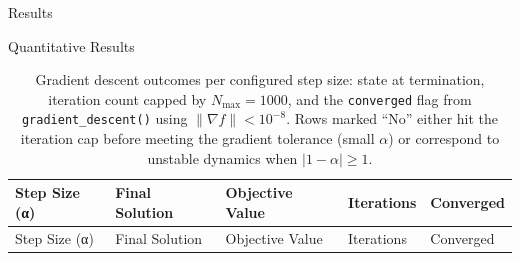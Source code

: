 \documentclass[
  ignorenonframetext,
]{beamer}
\begin{document}
\begin{frame}[fragile]{Results}
\begin{block}{Quantitative Results}
\begin{longtable}[]{@{}
  >{\raggedright\arraybackslash}p{}
  >{\raggedright\arraybackslash}p{}
  >{\raggedright\arraybackslash}p{}
  >{\raggedright\arraybackslash}p{}
  >{\raggedright\arraybackslash}p{}@{}}
\caption{Gradient descent outcomes per configured step size: state at
termination, iteration count capped by \(N_{\max} = 1000\), and the
\protect\texttt{converged} flag from
\protect\texttt{gradient\_descent()} using \(\|\nabla f\| < 10^{-8}\).
Rows marked ``No'' either hit the iteration cap before meeting the
gradient tolerance (small \(\alpha\)) or correspond to unstable dynamics
when \(|1-\alpha| \geq 1\). \label{tab:opt_results}}\tabularnewline
\toprule\noalign{}
\begin{minipage}[b]{\linewidth}\raggedright
Step Size (α)
\end{minipage} & \begin{minipage}[b]{\linewidth}\raggedright
Final Solution
\end{minipage} & \begin{minipage}[b]{\linewidth}\raggedright
Objective Value
\end{minipage} & \begin{minipage}[b]{\linewidth}\raggedright
Iterations
\end{minipage} & \begin{minipage}[b]{\linewidth}\raggedright
Converged
\end{minipage} \\
\midrule\noalign{}
\endfirsthead
\toprule\noalign{}
\begin{minipage}[b]{\linewidth}\raggedright
Step Size (α)
\end{minipage} & \begin{minipage}[b]{\linewidth}\raggedright
Final Solution
\end{minipage} & \begin{minipage}[b]{\linewidth}\raggedright
Objective Value
\end{minipage} & \begin{minipage}[b]{\linewidth}\raggedright
Iterations
\end{minipage} & \begin{minipage}[b]{\linewidth}\raggedright
Converged
\end{minipage} \\

\end{longtable}
\end{block}
\end{frame}
\end{document}
